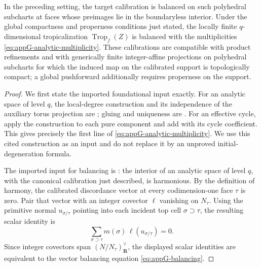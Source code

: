 \begin{theorem}\label{thm:appG-analytic-calibration}
In the preceding setting, the target calibration is balanced on such
polyhedral subcharts at faces whose preimages lie in the boundaryless
interior.  Under the global compactness and properness conditions just
stated, the locally finite \(q\)-dimensional tropicalization
\(\operatorname{Trop}_f(Z)\) is balanced with the multiplicities
\eqref{eq:appG-analytic-multiplicity}.
These calibrations are compatible with product refinements and with
generically finite integer-affine projections on polyhedral subcharts for
which the induced map on the calibrated support is topologically compact; a
global pushforward additionally requires properness on the support.
\end{theorem}

\begin{proof}
We first state the imported foundational input exactly.  For an analytic
space of level \(q\), the local-degree construction and its independence of
the auxiliary torus projection are
\cite[Proposition~14.3.1 and \S14.3.2]{CLD25}; gluing and uniqueness are
\cite[Lemma~14.3.4 and Definition~14.3.5]{CLD25}.  For an effective cycle,
apply the construction to each pure component and add with its cycle
coefficient.  This gives precisely the first line of
\eqref{eq:appG-analytic-multiplicity}.  We use this cited construction as an
input and do not replace it by an unproved initial-degeneration formula.

The imported input for balancing is
\cite[Theorem~15.6.1]{CLD25}: the interior of an analytic space of level
\(q\), with the canonical calibration just described, is harmonious.  By the
definition of harmony, the calibrated discordance vector at every
codimension-one face \(\tau\) is zero.  Pair that vector with an integer
covector \(\ell\) vanishing on \(N_\tau\).  Using the primitive normal
\(u_{\sigma/\tau}\) pointing into each incident top cell
\(\sigma\supset\tau\), the resulting scalar identity is
\[
       \sum_{\sigma\supset\tau}
       m(\sigma)\,\ell(u_{\sigma/\tau})=0.
\]
Since integer covectors span
\((N/N_\tau)^\vee_{\mathbf R}\), the displayed scalar identities are
equivalent to the vector balancing equation
\eqref{eq:appG-balancing}.


\end{proof}
